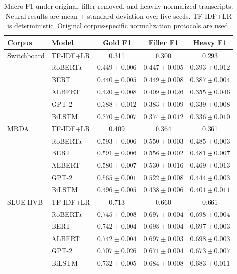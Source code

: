 \documentclass[conference]{IEEEtran}
\begin{document}
\begin{table}[t]
\caption{Macro-F1 under original, filler-removed, and
heavily normalized transcripts. Neural results are
mean $\pm$ standard deviation over five seeds.
TF-IDF+LR is deterministic. Original corpus-specific
normalization protocols are used.}
\label{tab:grid}
\centering
\footnotesize
\setlength{\tabcolsep}{5pt}
\renewcommand{\arraystretch}{0.95}
\begin{tabular*}{\textwidth}
{@{\extracolsep{\fill}}llccc@{}}
\toprule
\textbf{Corpus} & \textbf{Model} &
\textbf{Gold F1} & \textbf{Filler F1} &
\textbf{Heavy F1} \\
\midrule
Switchboard & TF-IDF+LR & 0.311 & 0.300 & 0.293 \\
            & RoBERTa & $0.449\pm0.006$ & $0.447\pm0.005$ & $0.393\pm0.012$ \\
            & BERT    & $0.440\pm0.005$ & $0.449\pm0.008$ & $0.387\pm0.004$ \\
            & ALBERT  & $0.420\pm0.008$ & $0.409\pm0.026$ & $0.355\pm0.046$ \\
            & GPT-2   & $0.388\pm0.012$ & $0.383\pm0.009$ & $0.339\pm0.008$ \\
            & BiLSTM  & $0.370\pm0.007$ & $0.374\pm0.012$ & $0.336\pm0.010$ \\
\midrule
MRDA        & TF-IDF+LR & 0.409 & 0.364 & 0.361 \\
            & RoBERTa & $0.593\pm0.006$ & $0.550\pm0.003$ & $0.485\pm0.003$ \\
            & BERT    & $0.591\pm0.006$ & $0.556\pm0.002$ & $0.481\pm0.007$ \\
            & ALBERT  & $0.580\pm0.007$ & $0.530\pm0.016$ & $0.469\pm0.013$ \\
            & GPT-2   & $0.565\pm0.001$ & $0.522\pm0.008$ & $0.444\pm0.003$ \\
            & BiLSTM  & $0.496\pm0.005$ & $0.438\pm0.006$ & $0.401\pm0.011$ \\
\midrule
SLUE-HVB    & TF-IDF+LR & 0.713 & 0.660 & 0.661 \\
            & RoBERTa & $0.745\pm0.008$ & $0.697\pm0.004$ & $0.698\pm0.004$ \\
            & BERT    & $0.742\pm0.004$ & $0.698\pm0.004$ & $0.697\pm0.003$ \\
            & ALBERT  & $0.742\pm0.004$ & $0.697\pm0.003$ & $0.698\pm0.003$ \\
            & GPT-2   & $0.707\pm0.026$ & $0.671\pm0.004$ & $0.673\pm0.007$ \\
            & BiLSTM  & $0.732\pm0.005$ & $0.684\pm0.008$ & $0.683\pm0.011$ \\
\bottomrule
\end{tabular*}
\end{table}
\end{document}
